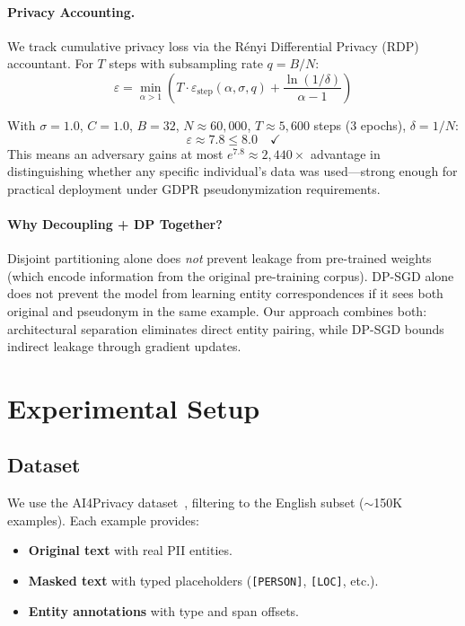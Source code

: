 \documentclass[11pt, a4paper]{article}
\begin{document}
\paragraph{Privacy Accounting.}
We track cumulative privacy loss via the R\'{e}nyi Differential Privacy
(RDP) accountant.  For $T$ steps with subsampling rate $q = B/N$:
\begin{equation}
  \varepsilon = \min_{\alpha > 1} \left(
    T \cdot \varepsilon_{\text{step}}(\alpha, \sigma, q)
    + \frac{\ln(1/\delta)}{\alpha - 1}
  \right)
  \label{eq:rdp}
\end{equation}

\begin{keyinsight}
With $\sigma = 1.0$, $C = 1.0$, $B = 32$, $N \approx 60{,}000$,
$T \approx 5{,}600$ steps (3 epochs), $\delta = 1/N$:
\[
  \varepsilon \approx 7.8 \leq 8.0 \quad \checkmark
\]
This means an adversary gains at most $e^{7.8} \approx 2{,}440\times$
advantage in distinguishing whether any specific individual's data was
used---strong enough for practical deployment under GDPR
pseudonymization requirements.
\end{keyinsight}

\paragraph{Why Decoupling + DP Together?}
Disjoint partitioning alone does \emph{not} prevent leakage from
pre-trained weights (which encode information from the original
pre-training corpus).  DP-SGD alone does not prevent the model from
learning entity correspondences if it sees both original and pseudonym
in the same example.  Our approach combines both: architectural
separation eliminates direct entity pairing, while DP-SGD bounds
indirect leakage through gradient updates.


\section{Experimental Setup}
\label{sec:experiments}

\subsection{Dataset}

We use the AI4Privacy dataset~\cite{pilán2022ai4privacy}, filtering to
the English subset ($\sim$150K examples).  Each example provides:
\begin{itemize}[leftmargin=*]
  \item \textbf{Original text} with real PII entities.
  \item \textbf{Masked text} with typed placeholders
        (\texttt{[PERSON]}, \texttt{[LOC]}, etc.).
  \item \textbf{Entity annotations} with type and span offsets.
\end{itemize}
\end{document}
